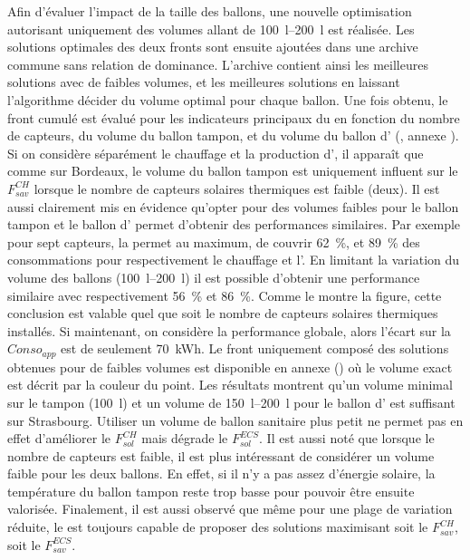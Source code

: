 Afin d’évaluer l’impact de la taille des ballons, une nouvelle optimisation
autorisant uniquement des volumes allant de \SIrange{100}{200}{\litre} est réalisée.
Les solutions optimales des deux fronts sont ensuite
ajoutées dans une archive commune sans relation de dominance. L’archive contient ainsi les meilleures
solutions avec de faibles volumes, et les meilleures solutions en laissant l’algorithme décider
du volume optimal pour chaque ballon.
Une fois obtenu, le front cumulé est évalué pour les indicateurs principaux du 
en fonction du nombre de capteurs, du volume du ballon tampon, et du volume du ballon d’
(, annexe ).
Si on considère séparément le chauffage et la production d’,
il apparaît que comme sur Bordeaux, le volume du ballon tampon est uniquement influent
sur le $F_{sav}^{CH}$ lorsque le nombre de capteurs solaires thermiques est faible (deux).
Il est aussi clairement mis en évidence qu’opter pour des volumes faibles pour le
ballon tampon et le ballon d’ permet d’obtenir des performances similaires.
Par exemple pour sept capteurs, la  permet au maximum, de couvrir
\SI{62}{\percent}, et \SI{89}{\percent} des consommations pour respectivement le chauffage et l’.
En limitant la variation du volume des ballons (\SIrange{100}{200}{\litre}) il est possible d’obtenir
une performance similaire avec respectivement
\SI{56}{\percent} et \SI{86}{\percent}. Comme le montre la figure, cette conclusion est valable
quel que soit le nombre de capteurs solaires thermiques installés. Si maintenant, on considère
la performance globale, alors l’écart sur la $Conso_{app}$ est de seulement \SI{70}{kWh}.
Le front uniquement composé des solutions obtenues pour de faibles volumes est disponible
en annexe () où le volume exact est décrit par
la couleur du point. Les résultats montrent qu’un volume minimal sur le tampon (\SI{100}{\litre})
et un volume de \SIrange{150}{200}{\litre} pour le ballon d’ est suffisant sur Strasbourg.
Utiliser un volume de ballon sanitaire plus petit ne permet pas en effet d’améliorer le
$F_{sol}^{CH}$ mais dégrade le $F_{sol}^{ECS}$.
Il est aussi noté que lorsque le nombre de capteurs est faible, il est plus intéressant de
considérer un volume faible pour les deux ballons. En effet, si il n’y a pas assez
d’énergie solaire, la température du ballon tampon reste trop basse pour pouvoir être
ensuite valorisée. Finalement, il est aussi observé que même pour une plage de variation
réduite, le  est toujours capable de proposer des solutions maximisant soit le
$F_{sav}^{CH}$, soit le $F_{sav}^{ECS}$.

